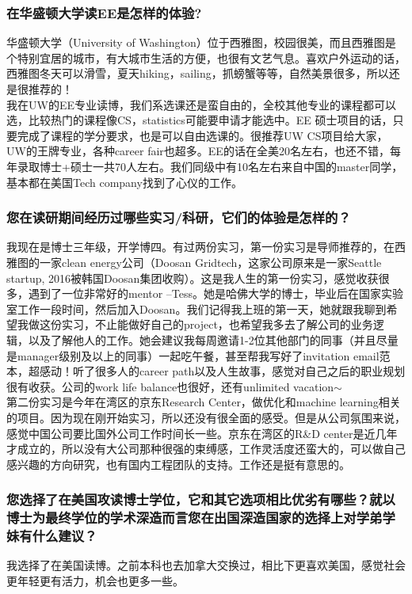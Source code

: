 \documentclass[a4paper,UTF8]{book}
\begin{document}
    \subsubsection*{在华盛顿大学读EE是怎样的体验?}
    华盛顿大学（University of Washington）位于西雅图，校园很美，而且西雅图是个特别宜居的城市，有大城市生活的方便，也很有文艺气息。喜欢户外运动的话，西雅图冬天可以滑雪，夏天hiking，sailing，抓螃蟹等等，自然美景很多，所以还是很推荐的！\\
    我在UW的EE专业读博，我们系选课还是蛮自由的，全校其他专业的课程都可以选，比较热门的课程像CS，statistics可能要申请才能选中。EE 硕士项目的话，只要完成了课程的学分要求，也是可以自由选课的。很推荐UW CS项目给大家，UW的王牌专业，各种career fair也超多。EE的话在全美20名左右，也还不错，每年录取博士+硕士一共70人左右。我们同级中有10名左右来自中国的master同学，基本都在美国Tech company找到了心仪的工作。

    \subsubsection*{您在读研期间经历过哪些实习/科研，它们的体验是怎样的？}
    我现在是博士三年级，开学博四。有过两份实习，第一份实习是导师推荐的，在西雅图的一家clean energy公司（Doosan Gridtech，这家公司原来是一家Seattle startup, 2016被韩国Doosan集团收购）。这是我人生的第一份实习，感觉收获很多，遇到了一位非常好的mentor --Tess。她是哈佛大学的博士，毕业后在国家实验室工作一段时间，然后加入Doosan。我们记得我上班的第一天，她就跟我聊到希望我做这份实习，不止能做好自己的project，也希望我多去了解公司的业务逻辑，以及了解他人的工作。她会建议我每周邀请1-2位其他部门的同事（并且尽量是manager级别及以上的同事）一起吃午餐，甚至帮我写好了invitation email范本，超感动！听了很多人的career path以及人生故事，感觉对自己之后的职业规划很有收获。公司的work life balance也很好，还有unlimited vacation$\sim$\\
    第二份实习是今年在湾区的京东Research Center，做优化和machine learning相关的项目。因为现在刚开始实习，所以还没有很全面的感受。但是从公司氛围来说，感觉中国公司要比国外公司工作时间长一些。京东在湾区的R\&D center是近几年才成立的，所以没有大公司那种很强的束缚感，工作灵活度还蛮大的，可以做自己感兴趣的方向研究，也有国内工程团队的支持。工作还是挺有意思的。

    \subsubsection*{您选择了在美国攻读博士学位，它和其它选项相比优劣有哪些？就以博士为最终学位的学术深造而言您在出国深造国家的选择上对学弟学妹有什么建议？}
    我选择了在美国读博。之前本科也去加拿大交换过，相比下更喜欢美国，感觉社会更年轻更有活力，机会也更多一些。
\end{document}
